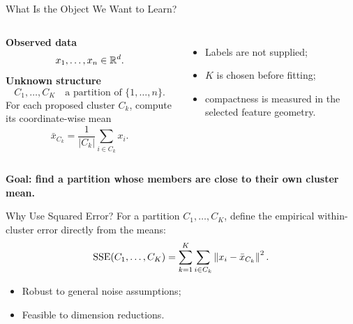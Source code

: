 \begin{frame}{What Is the Object We Want to Learn?}
  \begin{columns}[T,onlytextwidth]
      \textbf{Observed data}
      \[
        x_1,\ldots,x_n\in\mathbb R^d.
      \]
      \vspace{.08cm}
      \textbf{Unknown structure}
      \[
        C_1,\ldots,C_K\quad\text{a partition of }\{1,\ldots,n\}.
      \]
      For each proposed cluster $C_k$, compute its coordinate-wise mean
      \[
        \bar x_{C_k}=\frac{1}{|C_k|}\sum_{i\in C_k}x_i.
      \]
      \begin{itemize}\spaceditems
        \item Labels are not supplied;
        \item $K$ is chosen before fitting;
        \item compactness is measured in the selected feature geometry.
      \end{itemize}
  \end{columns}
  \vspace{.28cm}
  \centering
  \textbf{Goal: find a partition whose members are close to their own cluster mean.}
\end{frame}

\begin{frame}{Why Use Squared Error?}
  \small
  For a partition $C_1,\ldots,C_K$, define the empirical within-cluster error directly from the means:
  \[
    \operatorname{SSE}(C_1,\ldots,C_K)
    =\sum_{k=1}^{K}\sum_{i\in C_k}\left\lVert x_i-\bar x_{C_k}\right\rVert^2.
  \]
  \vspace{.08cm}
\begin{itemize}
	\item  Robust to general noise assumptions;
	\item  Feasible to dimension reductions.
\end{itemize}
\end{frame}



